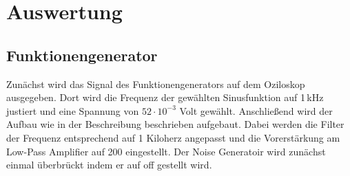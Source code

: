 \section{Auswertung}
\label{sec:Auswertung}
\subsection{Funktionengenerator}
Zunächst wird das Signal des Funktionengenerators auf dem Oziloskop ausgegeben. Dort wird die Frequenz der gewählten Sinusfunktion auf 1$\,$kHz justiert und eine Spannung von $52 \cdot 10^{-3}$ Volt gewählt. Anschließend wird der Aufbau wie in der Beschreibung beschrieben aufgebaut. Dabei werden die Filter der Frequenz entsprechend auf 1 Kiloherz angepasst und die Vorerstärkung am Low-Pass Amplifier auf 200 eingestellt. Der Noise Generatoir wird zunächst einmal überbrückt indem er auf off gestellt wird.
